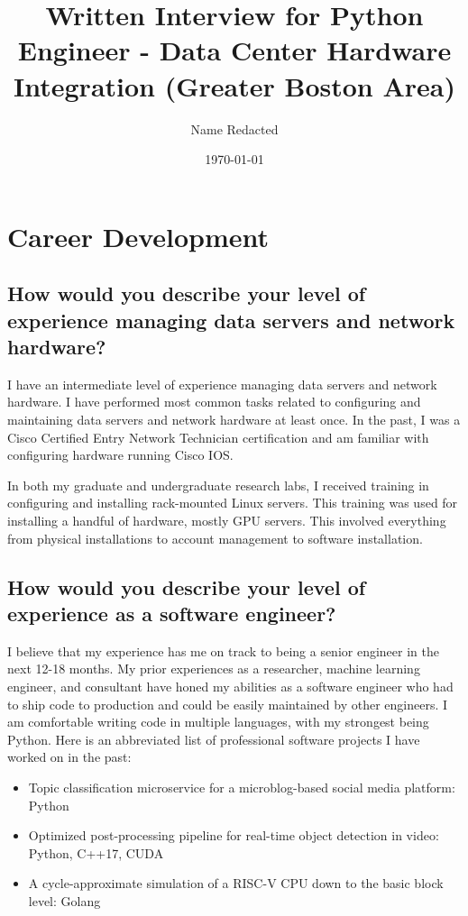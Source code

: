 \documentclass{article}
\title{Written Interview for Python Engineer - Data Center Hardware Integration (Greater Boston Area)}
\author{Name Redacted}
\date{\today}
\begin{document}
\maketitle

\section{Career Development}
\subsection{How would you describe your level of experience managing data servers and network hardware?}

I have an intermediate level of experience managing data servers and network
hardware. I have performed most common tasks related to configuring and
maintaining data servers and network hardware at least once. In the past, I was
a Cisco Certified Entry Network Technician certification and am familiar with
configuring hardware running Cisco IOS.

In both my graduate and undergraduate research labs, I received training in
configuring and installing rack-mounted Linux servers. This training was used
for installing a handful of hardware, mostly GPU servers.  This involved
everything from physical installations to account management to software
installation.

\subsection{How would you describe your level of experience as a software
    engineer?}

I believe that my experience has me on track to being a senior engineer in the
next 12-18 months. My prior experiences as a researcher, machine learning
engineer, and consultant have honed my abilities as a software engineer who had
to ship code to production and could be easily maintained by other engineers. I
am comfortable writing code in multiple languages, with my strongest being
Python. Here is an abbreviated list of professional software projects I have worked
on in the past:
\begin{itemize}
    \item Topic classification microservice for a microblog-based social media platform: Python
    \item Optimized post-processing pipeline for real-time object detection in video: Python, C++17, CUDA
    \item A cycle-approximate simulation of a RISC-V CPU down to the basic block level: Golang
\end{itemize}
\end{document}
